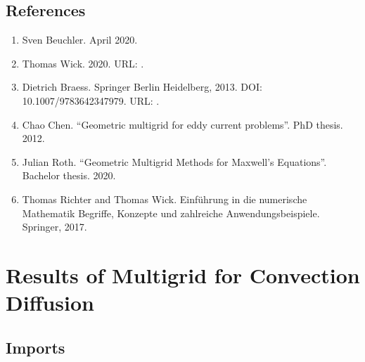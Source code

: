 \documentclass[letterpaper,10pt,english, openany]{sphinxmanual}
\begin{document}
\section{References}
\label{\detokenize{basics:references}}\begin{enumerate}
%
\item {} 
Sven Beuchler.  April 2020.

\item {} 
Thomas Wick.  2020. URL: .

\item {} 
Dietrich Braess.  Springer Berlin Heidelberg, 2013. DOI: 10.1007/978\sphinxhyphen{}3\sphinxhyphen{}642\sphinxhyphen{}34797\sphinxhyphen{}9. URL: .

\item {} 
Chao Chen. “Geometric multigrid for eddy current problems”. PhD thesis. 2012.

\item {} 
Julian Roth. “Geometric Multigrid Methods for Maxwell’s Equations”. Bachelor thesis. 2020.

\item {} 
Thomas Richter and Thomas Wick. Einführung in die numerische Mathematik \sphinxhyphen{} Begriffe, Konzepte und zahlreiche Anwendungsbeispiele. Springer, 2017.

\end{enumerate}


\chapter{Results of Multigrid for Convection Diffusion}
\label{\detokenize{Multigrid:Results-of-Multigrid-for-Convection-Diffusion}}\label{\detokenize{Multigrid::doc}}

\section{Imports}
\label{\detokenize{Multigrid:Imports}}
{
\begin{sphinxVerbatim}[commandchars=\\\{\}]
\llap{\color{nbsphinxin}[1]:\,\hspace{\fboxrule}\hspace{\fboxsep}}    
 
  \PYG{l+s+s1}{[}\PYG{l+s+s1}{] \PYGZhy{} [}\PYG{l+s+s1}{] \PYGZhy{} }
\end{sphinxVerbatim}
}
\end{document}
